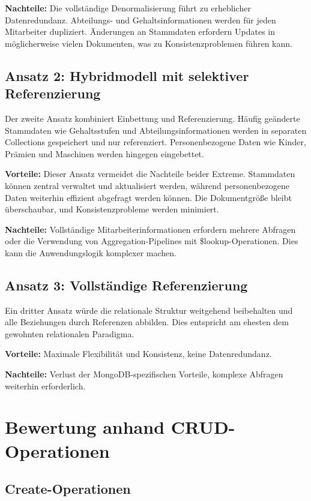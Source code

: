 \documentclass[12pt,a4paper]{article}
\begin{document}
\textbf{Nachteile:} Die vollständige Denormalisierung führt zu erheblicher Datenredundanz. Abteilungs- und Gehaltsinformationen werden für jeden Mitarbeiter dupliziert. Änderungen an Stammdaten erfordern Updates in möglicherweise vielen Dokumenten, was zu Konsistenzproblemen führen kann.

\subsection{Ansatz 2: Hybridmodell mit selektiver Referenzierung}

Der zweite Ansatz kombiniert Einbettung und Referenzierung. Häufig geänderte Stammdaten wie Gehaltsstufen und Abteilungsinformationen werden in separaten Collections gespeichert und nur referenziert. Personenbezogene Daten wie Kinder, Prämien und Maschinen werden hingegen eingebettet.

\textbf{Vorteile:} Dieser Ansatz vermeidet die Nachteile beider Extreme. Stammdaten können zentral verwaltet und aktualisiert werden, während personenbezogene Daten weiterhin effizient abgefragt werden können. Die Dokumentgröße bleibt überschaubar, und Konsistenzprobleme werden minimiert.

\textbf{Nachteile:} Vollständige Mitarbeiterinformationen erfordern mehrere Abfragen oder die Verwendung von Aggregation-Pipelines mit \$lookup-Operationen. Dies kann die Anwendungslogik komplexer machen.

\subsection{Ansatz 3: Vollständige Referenzierung}

Ein dritter Ansatz würde die relationale Struktur weitgehend beibehalten und alle Beziehungen durch Referenzen abbilden. Dies entspricht am ehesten dem gewohnten relationalen Paradigma.

\textbf{Vorteile:} Maximale Flexibilität und Konsistenz, keine Datenredundanz.

\textbf{Nachteile:} Verlust der MongoDB-spezifischen Vorteile, komplexe Abfragen weiterhin erforderlich.

\section{Bewertung anhand CRUD-Operationen}

\subsection{Create-Operationen}
\end{document}
